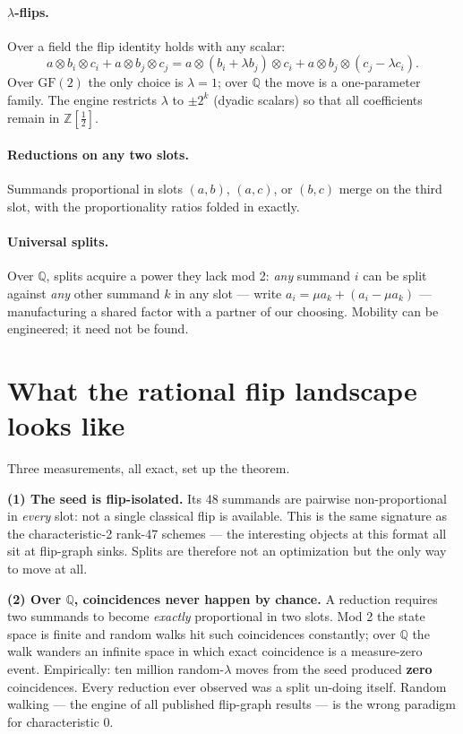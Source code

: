 \documentclass[10pt]{article}
\begin{document}
\paragraph{$\lambda$-flips.}
Over a field the flip identity holds with any scalar:
\[
  a\otimes b_i\otimes c_i + a\otimes b_j\otimes c_j
  =
  a\otimes(b_i{+}\lambda b_j)\otimes c_i
  + a\otimes b_j\otimes(c_j{-}\lambda c_i).
\]
Over $\mathrm{GF}(2)$ the only choice is $\lambda=1$; over
$\mathbb{Q}$ the move is a one-parameter family. The engine restricts
$\lambda$ to $\pm2^k$ (dyadic scalars) so that all coefficients remain
in $\mathbb{Z}[\tfrac12]$.

\paragraph{Reductions on any two slots.}
Summands proportional in slots $(a,b)$, $(a,c)$, or $(b,c)$ merge on
the third slot, with the proportionality ratios folded in exactly.

\paragraph{Universal splits.}
Over $\mathbb{Q}$, splits acquire a power they lack mod 2:
\emph{any} summand $i$ can be split against \emph{any} other summand
$k$ in any slot --- write $a_i=\mu a_k+(a_i-\mu a_k)$ ---
manufacturing a shared factor with a partner of our choosing.
Mobility can be engineered; it need not be found.

\section{What the rational flip landscape looks like}\label{sec:landscape}

Three measurements, all exact, set up the theorem.

\textbf{(1) The seed is flip-isolated.} Its 48 summands are pairwise
non-proportional in \emph{every} slot: not a single classical flip is
available. This is the same signature as the characteristic-2
rank-47 schemes --- the interesting objects at this format all sit at
flip-graph sinks. Splits are therefore not an optimization but the
only way to move at all.

\textbf{(2) Over $\mathbb{Q}$, coincidences never happen by chance.}
A reduction requires two summands to become \emph{exactly}
proportional in two slots. Mod 2 the state space is finite and random
walks hit such coincidences constantly; over $\mathbb{Q}$ the walk
wanders an infinite space in which exact coincidence is a
measure-zero event. Empirically: ten million random-$\lambda$ moves
from the seed produced \textbf{zero} coincidences. Every reduction
ever observed was a split un-doing itself. Random walking --- the
engine of all published flip-graph results --- is the wrong paradigm
for characteristic 0.
\end{document}
